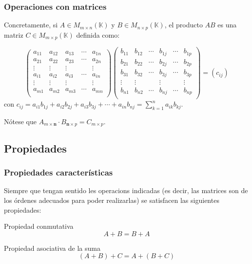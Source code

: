 \documentclass[12pt]{article}
\begin{document}
   \begin{frame}
  \frametitle{Operaciones con matrices}
 Concretamente, si $A \in M_{m\times n}(\mathbb{K})$ y $B \in M_{n\times p}(\mathbb{K})$, el producto $AB$ es una matriz $C \in M_{m\times p}(\mathbb{K})$ definida como:

\[  \left( \begin{matrix} %
      a_{11} & a_{12} & a_{13} & \cdots & a_{1n} \\
      a_{21} & a_{22} & a_{23} & \cdots & a_{2n} \\
      \vdots & \vdots & \vdots &   & \vdots \\
      a_{i1} & a_{i2} & a_{i3} & \cdots & a_{in} \\
      \vdots & \vdots & \vdots &   & \vdots \\
      a_{m1} & a_{m2} & a_{m3} & \cdots & a_{mn} \\
   \end{matrix}
   \right)  
   \left( \begin{matrix} %
      b_{11} & b_{12} & \cdots & b_{1j} & \cdots & b_{1p} \\
      b_{21} & b_{22} & \cdots & b_{2j} & \cdots & b_{2p} \\
       b_{31} & b_{32} & \cdots & b_{3j} & \cdots & b_{3p} \\
      \vdots & \vdots & & \vdots &   & \vdots \\
      b_{n1} & b_{n2} & \cdots & b_{nj} & \cdots & b_{np} \\
   \end{matrix}
   \right) = (c_{ij})\]
   con $c_{ij} = a_{i1}b_{1j} + a_{i2}b_{2j}+a_{i3}b_{3j}+\cdots+a_{in}b_{nj} = \sum_{k=1}^n a_{ik}b_{kj}$.
   
   N\'otese que $A_{m\times \boldsymbol{n}}\cdot B_{\boldsymbol{n}\times p} = C_{m\times p}$. 
 \end{frame}
 
 
 \subsection{Propiedades}

  \begin{frame}
  \frametitle{Propiedades caracter\'isticas}
  
  Siempre que tengan sentido les operacions indicadas (es decir, las matrices son de los \'ordenes adecuados para poder realizarlas) se satisfacen las siguientes propiedades:
   \begin{block}{Propiedad conmutativa}
   \[A+B = B+A\]
  \end{block}
  
  
     \begin{block}{Propiedad asociativa de la suma}
   \[(A+B)+C= A+(B+C)\]
  \end{block}
  
  
 \end{frame}
 
\end{document}
